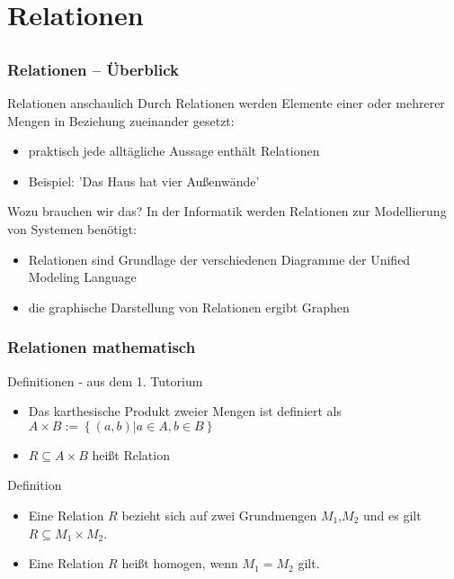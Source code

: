 
\section[Relationen]{Relationen}
\subsection*{}
\begin{frame}
	\frametitle{Relationen -- Überblick}
	\begin{block}{Relationen anschaulich}
		Durch Relationen werden Elemente einer oder mehrerer Mengen in Beziehung zueinander gesetzt:
		\begin{itemize}
			\item praktisch jede alltägliche Aussage enthält Relationen \pause
			\item Beispiel: 'Das Haus hat vier Außenwände'
		\end{itemize}
	\end{block}
	\pause
	\begin{block}{Wozu brauchen wir das?}
		In der Informatik werden Relationen zur Modellierung von Systemen benötigt: \pause
		\begin{itemize}
			\item Relationen sind Grundlage der verschiedenen Diagramme der Unified
			Modeling Language \pause
			\item die graphische Darstellung von Relationen ergibt Graphen
		\end{itemize}
	\end{block}

\end{frame}

\begin{frame}
	\frametitle{Relationen mathematisch}
	\begin{block}{Definitionen - aus dem 1. Tutorium}
		\begin{itemize}
			\item Das karthesische Produkt zweier Mengen ist definiert als $A \times B := \left\{(a, b)|a \in A, b \in B\right\}$
			\item $R \subseteq A \times B$ heißt Relation
	  	\end{itemize}
	\end{block}
	\pause
	\begin{block}{Definition}
	\begin{itemize}
		\item Eine Relation $R$ bezieht sich auf zwei Grundmengen $M_1$,$M_2$ und es gilt $R \subseteq M_1\times M_2$. \pause
		\item Eine Relation $R$ heißt homogen, wenn $M_1=M_2$ gilt.
	\end{itemize}
	\end{block}
\end{frame}

